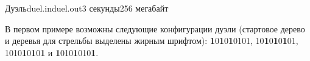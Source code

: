 \begin{problem}{Дуэль}{duel.in}{duel.out}{3 секунды}{256 мегабайт}
\Examples

\begin{example}%
%
%
\end{example}
\bigskip

В первом примере возможны следующие конфигурации дуэли
(стартовое дерево и деревья для стрельбы выделены жирным шрифтом):
{\bf 1}0{\bf 1}0{\bf 1}0101, 
10{\bf 1}0{\bf 1}0{\bf 1}01,
1010{\bf 1}0{\bf 1}0{\bf 1} и
{\bf 1}010{\bf 1}010{\bf 1}. 

\end{problem}

